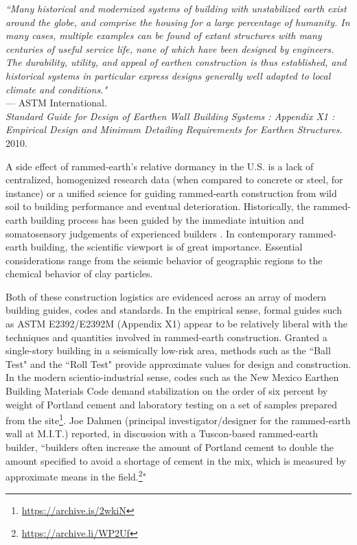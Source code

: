 \begin{flushright}
\small{
\textit{
``Many historical and modernized systems of building with unstabilized earth exist around the globe, and comprise the housing for a large percentage of humanity. In many cases, multiple examples can be found of extant structures with many centuries of useful service life, none of which have been designed by engineers. The durability, utility, and appeal of earthen construction is thus established, and historical systems in particular express designs generally well adapted to local climate and conditions."}} \\ --- ASTM International. \\ \textit{Standard Guide for Design of Earthen Wall Building Systems : Appendix X1 : Empirical Design and Minimum Detailing Requirements for Earthen Structures}. 2010.
\end{flushright}

A side effect of rammed-earth's relative dormancy in the U.S. is a lack of centralized, homogenized research data (when compared to concrete or steel, for instance) or a unified science for guiding rammed-earth construction from wild soil to building performance and eventual deterioration. Historically, the rammed-earth building process has been guided by the immediate intuition and somatosensory judgements of experienced builders \cite{RAMMEDEARTHHOUSE}. In contemporary rammed-earth building, the scientific viewport is of great importance. Essential considerations range from the seismic behavior of geographic regions to the chemical behavior of clay particles.

Both of these construction logistics are evidenced across an array of modern building guides, codes and standards. In the empirical sense, formal guides such as ASTM E2392/E2392M (Appendix X1) appear to be relatively liberal with the techniques and quantities involved in rammed-earth construction. Granted a single-story building in a seismically low-risk area, methods such as the ``Ball Test" and the ``Roll Test" provide approximate values for design and construction. In the modern scientio-industrial sense, codes such as the New Mexico Earthen Building Materials Code demand stabilization on the order of six percent by weight of Portland cement and laboratory testing on a set of samples prepared from the site\footnote{\url{https://archive.is/2wkiN}}. Joe Dahmen (principal investigator/designer for the rammed-earth wall at M.I.T.) reported, in discussion with a Tuscon-based rammed-earth builder, ``builders often increase the amount of Portland cement to double the amount specified to avoid a shortage of cement in the mix, which is measured by approximate means in the field.\footnote{\url{https://archive.li/WP2Uf}}"

